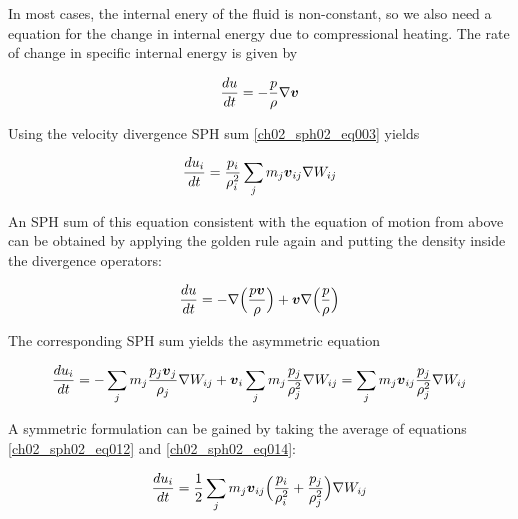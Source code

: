 In most cases, the internal enery of the fluid is non-constant, so we also need a equation for the change in internal energy due to compressional heating.
The rate of change in specific internal energy is given by 

\begin{equation}
\label{ch02_sph02_eq011}
\frac{du}{dt} = -\frac{p}{\rho} \nabla \boldsymbol{v}
\end{equation}

Using the velocity divergence SPH sum \ref{ch02_sph02_eq003}  yields

\begin{equation}
\label{ch02_sph02_eq012}
\frac{du_i}{dt} = \frac{p_i}{\rho_i^2} \sum_{j} m_j \boldsymbol{v}_{ij}  \nabla W_{ij}
\end{equation}

An SPH sum of this equation consistent with the equation of motion from above can be obtained by applying the golden rule again and putting the density inside the divergence operators:

\begin{equation}
\label{ch02_sph02_eq013}
\frac{du}{dt} = - \nabla \Big( \frac{p \boldsymbol{v}}{\rho} \Big) + \boldsymbol{v} \nabla \Big( \frac{p}{\rho} \Big)
\end{equation}

The corresponding SPH sum yields the asymmetric equation

\begin{equation}
\label{ch02_sph02_eq014}
\frac{du_i}{dt} = - \sum_{j} m_{j} \frac{p_j \boldsymbol{v}_j}{\rho_j} \nabla W_{ij} + \boldsymbol{v}_i \sum_{j} m_{j} \frac{p_j}{\rho_j^2}  \nabla W_{ij} = \sum_{j} m_j \boldsymbol{v}_{ij} \frac{p_j}{\rho_j^2}  \nabla W_{ij}
\end{equation}

A symmetric formulation can be gained by taking the average of equations \ref{ch02_sph02_eq012} and \ref{ch02_sph02_eq014}:

\begin{equation}
\label{ch02_sph02_eq015}
\frac{du_i}{dt} = \frac{1}{2} \sum_{j} m_{j} \boldsymbol{v}_{ij} \Big( \frac{p_i}{\rho_i^2}  + \frac{p_j}{\rho_j^2} \Big) \nabla W_{ij}
\end{equation}

